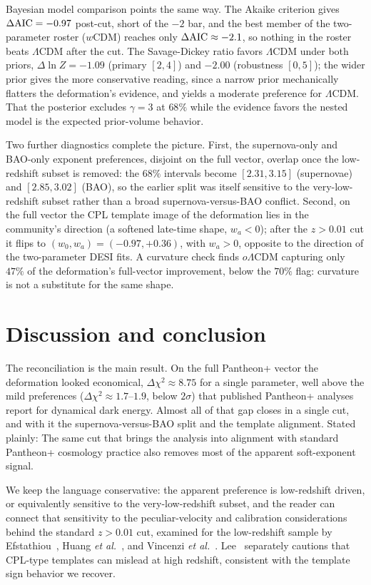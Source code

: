 \documentclass[
  aps,
  prd,
  reprint,           %
  nofootinbib,
  longbibliography
]{revtex4-2}
\begin{document}
Bayesian model comparison points the same way. The Akaike criterion gives
$\Delta{\rm AIC} = -0.97$ post-cut, short of the $-2$ bar, and the best
member of the two-parameter roster ($w$CDM) reaches only
$\Delta{\rm AIC} \approx -2.1$, so nothing in the roster beats
$\Lambda$CDM after the cut. The Savage-Dickey
ratio favors $\Lambda$CDM under both priors, $\Delta\ln Z = -1.09$
(primary $[2,4]$) and $-2.00$ (robustness $[0,5]$); the wider prior gives
the more conservative reading, since a narrow prior mechanically flatters
the deformation's evidence, and yields a moderate preference for
$\Lambda$CDM. That the posterior excludes $\gamma = 3$ at $68\%$ while the
evidence favors the nested model is the expected prior-volume behavior.

Two further diagnostics complete the picture. First, the supernova-only
and BAO-only exponent preferences, disjoint on the full vector, overlap
once the low-redshift subset is removed: the $68\%$ intervals become
$[2.31, 3.15]$ (supernovae) and $[2.85, 3.02]$ (BAO), so the earlier split
was itself sensitive to the very-low-redshift subset rather than a broad
supernova-versus-BAO conflict. Second, on the full vector the CPL template
image of the deformation lies in the community's direction (a softened
late-time shape, $w_a < 0$); after the $z > 0.01$ cut it flips to
$(w_0, w_a) = (-0.97, +0.36)$, with $w_a > 0$, opposite to the direction
of the two-parameter DESI fits. A curvature check finds $o\Lambda$CDM
capturing only $47\%$ of the deformation's full-vector improvement, below
the $70\%$ flag: curvature is not a substitute for the same shape.

\section{Discussion and conclusion}\label{sec:discussion}

The reconciliation is the main result. On the full Pantheon+ vector the
deformation looked economical, $\Delta\chi^2 \approx 8.75$ for a single
parameter, well above the mild preferences ($\Delta\chi^2 \approx 1.7$--$1.9$,
below $2\sigma$) that published Pantheon+ analyses report for dynamical
dark energy. Almost all of that gap closes in a single cut, and with it the
supernova-versus-BAO split and the template alignment. Stated plainly: The same cut that brings the
analysis into alignment with standard Pantheon+ cosmology practice also
removes most of the apparent soft-exponent signal.

We keep the language conservative: the apparent preference is low-redshift
driven, or equivalently sensitive to the very-low-redshift subset, and the
reader can connect that sensitivity to the peculiar-velocity and
calibration considerations behind the standard $z > 0.01$ cut, examined
for the low-redshift sample by Efstathiou~\cite{Efst}, Huang \textit{et
al.}~\cite{Huang}, and Vincenzi \textit{et al.}~\cite{Vincenzi}.
Lee~\cite{Lee} separately cautions
that CPL-type templates can mislead at high redshift, consistent with the
template sign behavior we recover.
\end{document}

